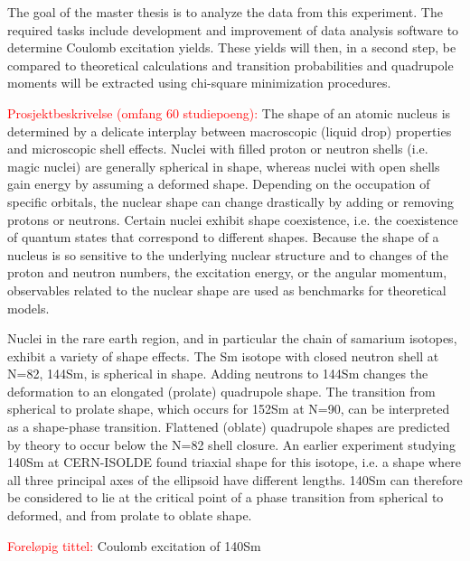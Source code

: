 \documentclass[twoside,english]{uiofysmaster/uiofysmaster}
\begin{document}
The goal of the master thesis is to analyze the data from this experiment. The required tasks include development and improvement of data analysis software to determine Coulomb excitation yields. These yields will then, in a second step, be compared to theoretical calculations and transition probabilities and quadrupole moments will be extracted using chi-square minimization procedures. \newline


\textcolor{red}{Prosjektbeskrivelse (omfang 60 studiepoeng):} \newline
The shape of an atomic nucleus is determined by a delicate interplay between macroscopic (liquid drop) properties and microscopic shell effects. Nuclei with filled proton or neutron shells (i.e. magic nuclei) are generally spherical in shape, whereas nuclei with open shells gain energy by assuming a deformed shape. Depending on the occupation of specific orbitals, the nuclear shape can change drastically by adding or removing protons or neutrons. Certain nuclei exhibit shape coexistence, i.e. the coexistence of quantum states that correspond to different shapes. Because the shape of a nucleus is so sensitive to the underlying nuclear structure and to changes of the proton and neutron numbers, the excitation energy, or the angular momentum, observables related to the nuclear shape are used as benchmarks for theoretical models. 

Nuclei in the rare earth region, and in particular the chain of samarium isotopes, exhibit a variety of shape effects. The Sm isotope with closed neutron shell at N=82, 144Sm, is spherical in shape. Adding neutrons to 144Sm changes the deformation to an elongated (prolate) quadrupole shape. The transition from spherical to prolate shape, which occurs for 152Sm at N=90, can be interpreted as a shape-phase transition. Flattened (oblate) quadrupole shapes are predicted by theory to occur below the N=82 shell closure. An earlier experiment studying 140Sm at CERN-ISOLDE found triaxial shape for this isotope, i.e. a shape where all three principal axes of the ellipsoid have different lengths. 140Sm can therefore be considered to lie at the critical point of a phase transition from spherical to deformed, and from prolate to oblate shape. \newline

\textcolor{red}{Foreløpig tittel:} \newline
Coulomb excitation of 140Sm \newline
\end{document}
